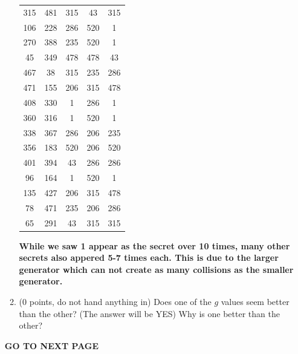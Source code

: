 \documentclass[12pt]{article}
\begin{document}
\begin{enumerate}
\begin{enumerate}
\begin{tabular}{|c|c|c|c|c|}
315 & 481 & 315 & 43 & 315 \\
106 & 228 & 286 & 520 & 1 \\
270 & 388 & 235 & 520 & 1 \\
45 & 349 & 478 & 478 & 43 \\
467 & 38 & 315 & 235 & 286 \\
471 & 155 & 206 & 315 & 478 \\
408 & 330 & 1 & 286 & 1 \\
360 & 316 & 1 & 520 & 1 \\
338 & 367 & 286 & 206 & 235 \\
356 & 183 & 520 & 206 & 520 \\
401 & 394 & 43 & 286 & 286 \\
96 & 164 & 1 & 520 & 1 \\
135 & 427 & 206 & 315 & 478 \\
78 & 471 & 235 & 206 & 286 \\
65 & 291 & 43 & 315 & 315 \\
\hline
\end{tabular}
\vspace{1cm}
\textbf{While we saw 1 appear as the secret over 10 times, many other secrets also appered 5-7 times each. This is due to the larger generator which can not create as many collisions as the smaller generator.}

\item 
(0 points, do not hand anything in)
Does one of the $g$ values seem better than the other?
(The answer will be YES)
Why is one better than the other?
\end{enumerate}

\vfill

\centerline{\bf GO TO NEXT PAGE}

\newpage


\end{enumerate}
\end{document}

